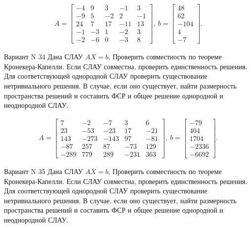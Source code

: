 \documentclass[11pt]{report}
\begin{document}
\begin{align*}
 A = \left[\begin{matrix}-4 & 9 & 3 & -1 & 3\\-9 & 5 & -2 & 2 & -1\\24 & 7 & 17 & -11 & 13\\-1 & -3 & 1 & -2 & 3\\-2 & -6 & 0 & -3 & 8\end{matrix}\right],
\ b = \left[\begin{matrix}48\\62\\-104\\4\\-7\end{matrix}\right]. 
 \end{align*}

Вариант N 34
Дана СЛАУ $AX = b$,
Проверить совместность по теореме Кронекера-Капелли. Если СЛАУ совместна, проверить единственность решения.
Для соответствующей однородной СЛАУ проверить существование нетривиального решения. В случае, если оно существует,
найти размерность пространства решений и составить ФСР и общее решение однородной  и неоднородной СЛАУ.


\begin{align*}
 A = \left[\begin{matrix}7 & -2 & -7 & 3 & 6\\23 & -53 & -23 & 17 & -21\\143 & -273 & -143 & 97 & -81\\-87 & 257 & 87 & -73 & 129\\-289 & 779 & 289 & -231 & 363\end{matrix}\right],
\ b = \left[\begin{matrix}-79\\404\\1704\\-2336\\-6692\end{matrix}\right]. 
 \end{align*}

Вариант N 35
Дана СЛАУ $AX = b$,
Проверить совместность по теореме Кронекера-Капелли. Если СЛАУ совместна, проверить единственность решения.
Для соответствующей однородной СЛАУ проверить существование нетривиального решения. В случае, если оно существует,
найти размерность пространства решений и составить ФСР и общее решение однородной  и неоднородной СЛАУ.
\end{document}
